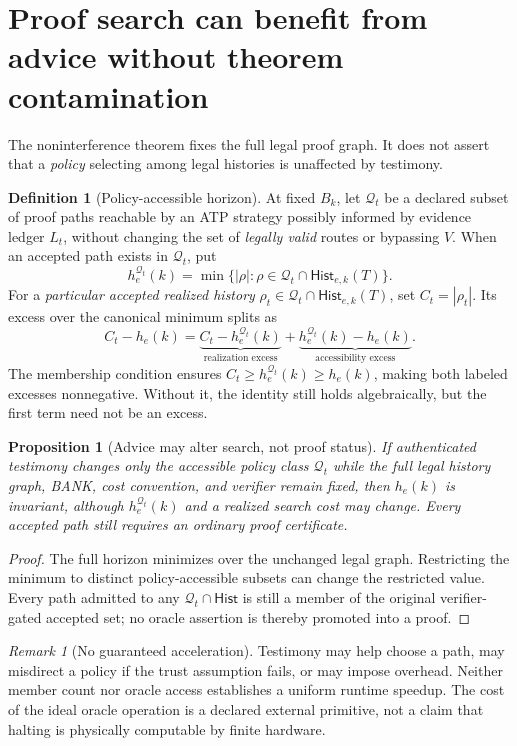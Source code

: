 \documentclass[11pt,letterpaper]{article}
\newtheorem{proposition}[theorem]{Proposition}
\theoremstyle{definition}
\newtheorem{definition}[theorem]{Definition}
\theoremstyle{remark}
\newtheorem{remark}[theorem]{Remark}
\newcommand{\Hist}{\mathsf{Hist}}
\begin{document}
\section{Proof search can benefit from advice without theorem contamination}
The noninterference theorem fixes the full legal proof graph. It does not assert that a \emph{policy} selecting among legal histories is unaffected by testimony.
\begin{definition}[Policy-accessible horizon]
At fixed $B_k$, let $\mathcal Q_t$ be a declared subset of proof paths reachable by an ATP strategy possibly informed by evidence ledger $L_t$, without changing the set of \emph{legally valid} routes or bypassing $V$. When an accepted path exists in $\mathcal Q_t$, put
\[
h_e^{\mathcal Q_t}(k)=\min\{|\rho|:\rho\in\mathcal Q_t\cap\Hist_{e,k}(T)\}.
\]
For a \emph{particular accepted realized history} $\rho_t\in\mathcal Q_t\cap\Hist_{e,k}(T)$, set $C_t=|\rho_t|$. Its excess over the canonical minimum splits as
\[
C_t-h_e(k)=\underbrace{C_t-h_e^{\mathcal Q_t}(k)}_{\text{realization excess}}+
\underbrace{h_e^{\mathcal Q_t}(k)-h_e(k)}_{\text{accessibility excess}}.
\]
The membership condition ensures $C_t\ge h_e^{\mathcal Q_t}(k)\ge h_e(k)$, making both labeled excesses nonnegative. Without it, the identity still holds algebraically, but the first term need not be an excess.
\end{definition}
\begin{proposition}[Advice may alter search, not proof status]
If authenticated testimony changes only the accessible policy class $\mathcal Q_t$ while the full legal history graph, BANK, cost convention, and verifier remain fixed, then $h_e(k)$ is invariant, although $h_e^{\mathcal Q_t}(k)$ and a realized search cost may change. Every accepted path still requires an ordinary proof certificate.
\end{proposition}
\begin{proof}
The full horizon minimizes over the unchanged legal graph. Restricting the minimum to distinct policy-accessible subsets can change the restricted value. Every path admitted to any $\mathcal Q_t\cap\Hist$ is still a member of the original verifier-gated accepted set; no oracle assertion is thereby promoted into a proof.
\end{proof}
\begin{remark}[No guaranteed acceleration]
Testimony may help choose a path, may misdirect a policy if the trust assumption fails, or may impose overhead. Neither member count nor oracle access establishes a uniform runtime speedup. The cost of the ideal oracle operation is a declared external primitive, not a claim that halting is physically computable by finite hardware.
\end{remark}
\end{document}
